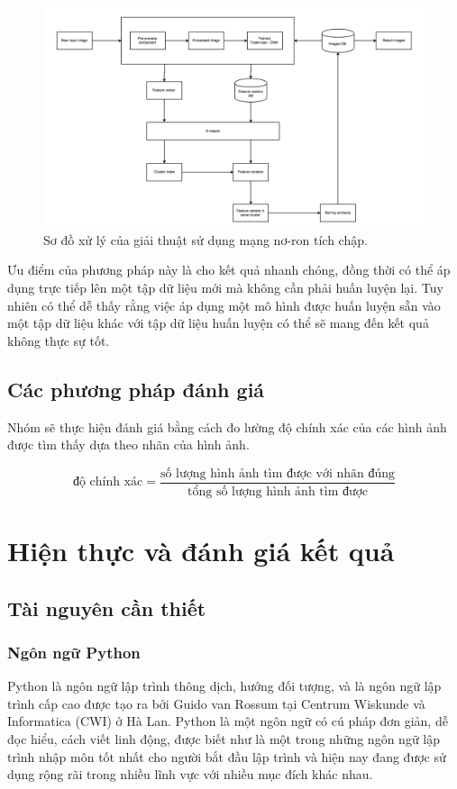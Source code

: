 \documentclass[a4paper,14pt]{extreport}
\begin{document}
\begin{figure}  
    \centering
    \includegraphics[scale=0.4]{img/CBIR-system.png}
    \caption{Sơ đồ xử lý của giải thuật sử dụng mạng nơ-ron tích chập.}
\end{figure}    

Ưu điểm của phương pháp này là cho kết quả nhanh chóng, đồng thời có thể áp dụng trực tiếp lên một tập 
dữ liệu mới mà không cần phải huấn luyện lại. Tuy nhiên có thể dễ thấy rằng việc áp dụng một mô hình 
được huấn luyện sẵn vào một tập dữ liệu khác với tập dữ liệu huấn luyện có thể sẽ mang đến kết quả không thực sự tốt.


\section{ Các phương pháp đánh giá }
Nhóm sẽ thực hiện đánh giá bằng cách đo lường độ chính xác của các hình ảnh được tìm thấy dựa theo nhãn 
của hình ảnh.

\[ \text{độ chính xác} = \frac{\text{số lượng hình ảnh tìm được với nhãn đúng}}{\text{tổng số lượng hình ảnh tìm được}} \]
\chapter{Hiện thực và đánh giá kết quả}
\section{Tài nguyên cần thiết}
\subsection{Ngôn ngữ Python}
Python là ngôn ngữ lập trình thông dịch, hướng đối tượng, và là ngôn ngữ lập trình cấp cao được tạo ra bởi Guido van Rossum tại Centrum Wiskunde và Informatica (CWI) ở Hà Lan. Python là một ngôn ngữ có cú pháp đơn giản, dễ đọc hiểu, cách viết linh động, được biết như là một trong những ngôn ngữ lập trình nhập môn tốt nhất cho người bắt đầu lập trình và hiện nay đang được sử dụng rộng rãi trong nhiều lĩnh vực với nhiều mục đích khác nhau.
\end{document}
